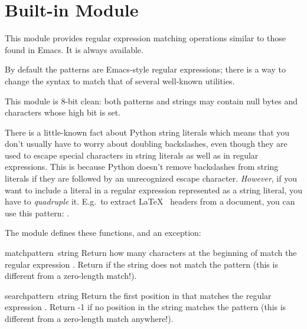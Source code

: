 \section{Built-in Module }

This module provides regular expression matching operations similar to
those found in Emacs.  It is always available.

By default the patterns are Emacs-style regular expressions; there is
a way to change the syntax to match that of several well-known
\UNIX{} utilities.

This module is 8-bit clean: both patterns and strings may contain null
bytes and characters whose high bit is set.

 There is a little-known fact about Python string
literals which means that you don't usually have to worry about
doubling backslashes, even though they are used to escape special
characters in string literals as well as in regular expressions.  This
is because Python doesn't remove backslashes from string literals if
they are followed by an unrecognized escape character.
\emph{However}, if you want to include a literal  in a
regular expression represented as a string literal, you have to
\emph{quadruple} it.  E.g.\  to extract \LaTeX\  headers from a document, you can use this pattern:
.

The module defines these functions, and an exception:

\renewcommand{\indexsubitem}{(in module regex)}

\begin{funcdesc}{match}{pattern\, string}
  Return how many characters at the beginning of  match
  the regular expression .  Return  if the
  string does not match the pattern (this is different from a
  zero-length match!).
\end{funcdesc}

\begin{funcdesc}{search}{pattern\, string}
  Return the first position in  that matches the regular
  expression .  Return -1 if no position in the string
  matches the pattern (this is different from a zero-length match
  anywhere!).
\end{funcdesc}

